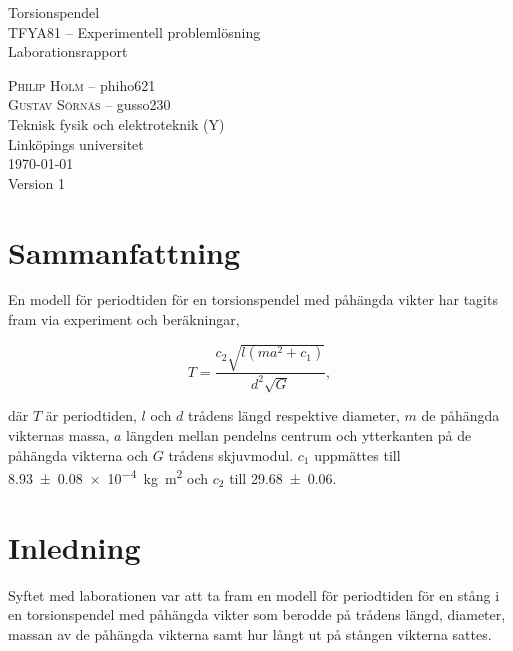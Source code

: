 \documentclass[a4paper,12pt]{article}
\begin{document}
\begin{titlepage}
  \centering
  \vspace{10cm}
  {\Huge Torsionspendel \\}
  \vspace{2cm}
  {\Large TFYA81 -- Experimentell problemlösning \\}
  \vspace{0.8em}
  {\Large Laborationsrapport}
  \vfill

  {
    \textsc{Philip Holm} -- phiho621 \\
    \textsc{Gustav Sörnäs} -- gusso230 \\
    \vspace{2cm}
    Teknisk fysik och elektroteknik (Y) \\
    Linköpings universitet\\\today{}\\Version 1
  }

\end{titlepage}

\section*{Sammanfattning}

En modell för periodtiden för en torsionspendel med påhängda vikter har tagits
fram via experiment och beräkningar,

\begin{equation*}
  T = \frac{c_2 \sqrt{l(ma^2 + c_1)}}{d^2 \sqrt{G}},
\end{equation*}

där $T$ är periodtiden, $l$ och $d$ trådens längd respektive diameter, $m$ de
påhängda vikternas massa, $a$ längden mellan pendelns centrum och ytterkanten på
de påhängda vikterna och $G$ trådens skjuvmodul. $c_1$ uppmättes till
\SI{8.93(8)e-4}{\kilogram \meter \squared} och $c_2$ till
\num{29.68(6)}.

\clearpage

\tableofcontents
\listoffigures
\listoftables
\clearpage


\section{Inledning}

Syftet med laborationen var att ta fram en modell för periodtiden för en stång i
en torsionspendel med påhängda vikter som berodde på trådens längd, diameter,
massan av de påhängda vikterna samt hur långt ut på stången vikterna sattes.
\end{document}

